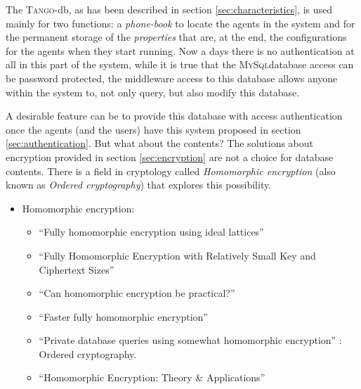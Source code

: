 \documentclass[10pt,a4paper,twoside]{llncs}
\newcommand{\tango}{\textsc{Tango}}
\newcommand{\mysql}{\textsc{MySql}}
\begin{document}
The \tango-db, as has been described in section \ref{sec:characteristics}, is used mainly for two functions: a \emph{phone-book} to locate the agents in the system and for the permanent storage of the \emph{properties} that are, at the end, the configurations for the agents when they start running. Now a days there is no authentication at all in this part of the system, while it is true that the \mysql database access can be password protected, the middleware access to this database allows anyone within the system to, not only query, but also modify this database.

A desirable feature can be to provide this database with access authentication once the agents (and the users) have this system proposed in section \ref{sec:authentication}. But what about the contents? The solutions about encryption provided in section \ref{sec:encryption} are not a choice for database contents. There is a field in cryptology called \emph{Homomorphic encryption} (also known as \emph{Ordered cryptography}) that explores this possibility.

    \begin{itemize}
        \item Homomorphic encryption:
        \begin{itemize}
            \item ``Fully homomorphic encryption using ideal lattices'' \cite{Gentry:2009:FHE:1536414.1536440}
            \item ``Fully Homomorphic Encryption with Relatively Small Key and Ciphertext Sizes''\cite{SmartVecauteren10}
            \item ``Can homomorphic encryption be practical?'' \cite{Naehrig:2011:HEP:2046660.2046682}
            \item ``Faster fully homomorphic encryption'' \cite{stehle2010faster}
            \item ``Private database queries using somewhat homomorphic encryption'' \cite{iacr422}: Ordered cryptography.
            \item ``Homomorphic Encryption: Theory \& Applications'' \cite{Jaydip2013}
        \end{itemize}

    \end{itemize}
\end{document}
